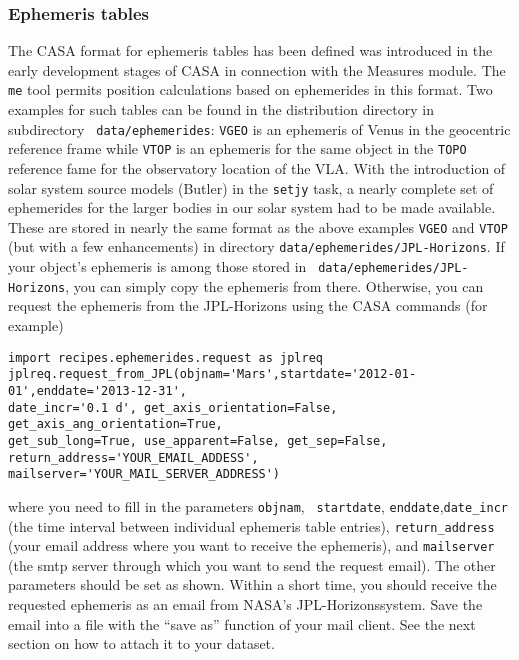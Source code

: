 \subsubsection{Ephemeris tables}

The CASA format for ephemeris tables has been defined was introduced
in the early development stages of CASA in connection with the
Measures module. The {\tt me} tool permits position calculations based
on ephemerides in this format. Two examples for such tables can be
found in the distribution directory in subdirectory {\tt
  data/ephemerides}: {\tt VGEO} is an ephemeris of Venus in the
geocentric reference frame while {\tt VTOP} is an ephemeris for the
same object in the {\tt TOPO} reference fame for the observatory
location of the VLA. With the introduction of solar system source
models (Butler) in the {\tt setjy} task, a nearly complete set of
ephemerides for the larger bodies in our solar system had to be made
available. These are stored in nearly the same format as the above
examples {\tt VGEO} and {\tt VTOP} (but with a few enhancements) in
directory {\tt data/ephemerides/JPL-Horizons}. If your object's
ephemeris is among those stored in {\tt
  data/ephemerides/JPL-Horizons}, you can simply copy the ephemeris
from there. Otherwise, you can request the ephemeris from the
JPL-Horizons using the CASA commands (for example)

\small
\begin{verbatim}   
import recipes.ephemerides.request as jplreq
jplreq.request_from_JPL(objnam='Mars',startdate='2012-01-01',enddate='2013-12-31',
date_incr='0.1 d', get_axis_orientation=False,
get_axis_ang_orientation=True,
get_sub_long=True, use_apparent=False, get_sep=False,
return_address='YOUR_EMAIL_ADDESS',
mailserver='YOUR_MAIL_SERVER_ADDRESS')
\end{verbatim}
\normalsize

where you need to fill in the parameters {\tt objnam}, {\tt
  startdate}, {\tt enddate},{\tt date\_incr} (the time interval between
individual ephemeris table entries), {\tt return\_address} (your email
address where you want to receive the ephemeris), and {\tt mailserver}
(the smtp server through which you want to send the request email). The
other parameters should be set as shown. Within a short time, you
should receive the requested ephemeris as an email from NASA's
JPL-Horizonssystem. Save the email into a file with the ``save as''
function of your mail client. See the next section on how to attach it
to your dataset.


